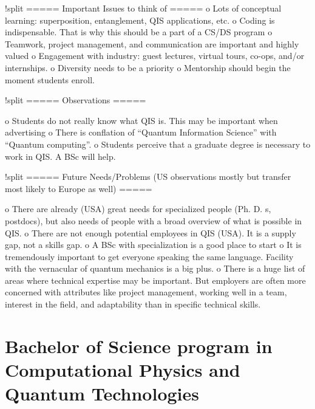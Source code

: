 \documentclass[oneside,final,10pt]{article}
\begin{document}
!split
===== Important Issues to think of =====
o Lots of conceptual learning: superposition, entanglement, QIS applications, etc.
o Coding is indispensable. That is why this should be a part of a CS/DS program
o Teamwork, project management, and communication are important and highly valued
o Engagement with industry: guest lectures, virtual tours, co-ops, and/or internships.
o Diversity needs to be a priority
o Mentorship should begin the moment students enroll.

!split
===== Observations =====

o Students do not really know what QIS is. This may be important when advertising
o There is conflation of “Quantum Information Science” with “Quantum computing”.
o Students perceive that a graduate degree is necessary to work in QIS. A BSc will help.

!split
===== Future Needs/Problems (US observations mostly but transfer most likely to Europe as well) =====

o There are already (USA) great needs for specialized people (Ph. D. s, postdocs), but also needs of  people with a broad overview of what is possible in QIS.
o There are not enough potential employees in QIS (USA). It is a supply gap, not a skills gap.
o A BSc with specialization  is a good place to start
o It is tremendously important to get everyone speaking the same language. Facility with the vernacular of quantum mechanics is a big plus.
o There is a huge list of areas where technical expertise may be important. But employers are often more concerned with attributes like project management, working well in a team, interest in the field, and adaptability than in specific technical skills.


\section*{Bachelor of Science program in Computational Physics and Quantum Technologies}
\end{document}
